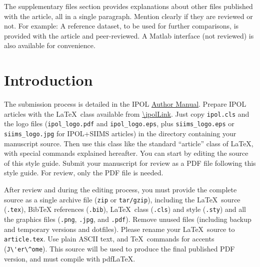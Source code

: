 \documentclass{ipol}
\begin{document}
\begin{ipolSupp}
The supplementary files section provides explanations about other
files published with the article, all in a single paragraph. Mention
clearly if they are reviewed or not. For example: A reference dataset,
to be used for further comparisons, is provided with the article and
peer-reviewed. A Matlab interface (not reviewed) is also available for
convenience.
\end{ipolSupp}




\section{Introduction}

The submission process is detailed in the IPOL
\href{https://tools.ipol.im/wiki/ref/author\_manual/}{Author Manual}. 
Prepare IPOL articles with the \LaTeX\ class available from
\url{\ipolLink}. Just copy \verb|ipol.cls| and the logo
files (\verb|ipol_logo.pdf| and \verb|ipol_logo.eps|, plus
\verb|siims_logo.eps| or \verb|siims_logo.jpg| for IPOL+SIIMS
articles) in the directory containing your manuscript source. Then use
this class like the standard ``article'' class of \LaTeX, with special
commands explained hereafter. You can start by editing the source of
this style guide. Submit your manuscript for review as a PDF file
following this style guide. For review, only the PDF file is needed.

After review and during the editing process, you must provide the
complete source as a single archive file (\verb|zip| or
\verb|tar/gzip|), including the \LaTeX\ source (\verb|.tex|), BibTeX
references (\verb|.bib|), \LaTeX\ class (\verb|.cls|) and style
(\verb|.sty|) and all the graphics files (\verb|.png|, \verb|.jpg|,
and \verb|.pdf|). Remove unused files (including backup and temporary
versions and dotfiles). Please rename your \LaTeX\ source to
\verb|article.tex|. Use plain ASCII text, and \TeX\ commands for
accents (\verb|J\'er\^ome|). This source will be used to produce the
final published PDF version, and must compile with pdf\LaTeX.
\end{document}
